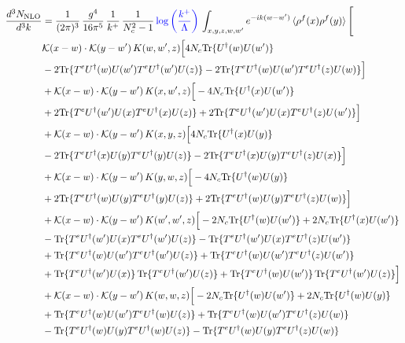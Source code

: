 \documentclass[9pt]{article}
\numberwithin{equation}{section}
\begin{document}
\begin{align}
    \frac{d^{3}N_{\mathrm{NLO}}}{d^{3}k} & = \frac{1}{(2\pi)^{3}}\,\frac{g^{4}}{16\pi^{5}}\,\frac{1}{k^{+}}\,\frac{1}{N^{2}_{c}-1}\,{\color{blue}\log{\left(\frac{k^{+}}{\Lambda}\right)}}\,\int_{x,y,z,w,w'}e^{-ik(w-w')}\,\langle\rho^{f}(x)\rho^{f}(y) \rangle\,\Bigg[\notag \\ & \mathcal K(x-w)\cdot\mathcal K(y-w')\,K(w,w',z)\Big[4 N_{c}{\rm Tr}\{U^\dagger(w)U(w')\}\notag\\
&-2{\rm Tr}\{T^eU^\dagger(w)U(w')T^eU^\dagger(w')U(z)\}-2{\rm Tr}\{T^eU^\dagger(w)U(w')T^eU^\dagger(z)U(w)\}\Big]\notag\\
&+\mathcal K(x-w)\cdot\mathcal K(y-w')\,K(x,w',z)\Big[-4 N_{c}{\rm Tr}\{U^\dagger(x)U(w')\}\notag\\
&+2{\rm Tr}\{T^eU^\dagger(w')U(x)T^eU^\dagger(x)U(z)\}+2{\rm Tr}\{T^eU^\dagger(w')U(x)T^eU^\dagger(z)U(w')\}\Big]\notag\\
&+\mathcal K(x-w)\cdot\mathcal K(y-w')\,K(x,y,z)\Big[4 N_{c}{\rm Tr}\{U^\dagger(x)U(y)\}\notag\\
&-2{\rm Tr}\{T^eU^\dagger(x)U(y)T^eU^\dagger(y)U(z)\}-2{\rm Tr}\{T^eU^\dagger(x)U(y)T^eU^\dagger(z)U(x)\}\Big]\notag\\
&+\mathcal K(x-w)\cdot\mathcal K(y-w')\,K(y,w,z)\Big[-4 N_{c}{\rm Tr}\{U^\dagger(w)U(y)\}\notag\\
&+2{\rm Tr}\{T^eU^\dagger(w)U(y)T^eU^\dagger(y)U(z)\}+2{\rm Tr}\{T^eU^\dagger(w)U(y)T^eU^\dagger(z)U(w)\}\Big]\notag\\
&+\mathcal K(x-w)\cdot\mathcal K(y-w')\,K(w',w',z)\Big[-2 N_{c}{\rm Tr}\{U^\dagger(w)U(w')\}+2 N_{c}{\rm Tr}\{U^\dagger(x)U(w')\}\notag\\
&-{\rm Tr}\{T^eU^\dagger(w')U(x)T^eU^\dagger(w')U(z)\}-{\rm Tr}\{T^eU^\dagger(w')U(x)T^eU^\dagger(z)U(w')\}\notag\\
&+{\rm Tr}\{T^eU^\dagger(w)U(w')T^eU^\dagger(w')U(z)\}+{\rm Tr}\{T^eU^\dagger(w)U(w')T^eU^\dagger(z)U(w')\}\notag\\
&+{\rm Tr}\{T^eU^\dagger(w')U(x)\}\,{\rm Tr}\{T^eU^\dagger(w')U(z)\}+{\rm Tr}\{T^eU^\dagger(w)U(w')\}\,{\rm Tr}\{T^eU^\dagger(w')U(z)\}\Big]\notag\\
&+\mathcal K(x-w)\cdot\mathcal K(y-w')\,K(w,w,z)\Big[-2 N_{c}{\rm Tr}\{U^\dagger(w)U(w')\}+2 N_{c}{\rm Tr}\{U^\dagger(w)U(y)\}\notag\\
&+{\rm Tr}\{T^eU^\dagger(w)U(w')T^eU^\dagger(w)U(z)\}+{\rm Tr}\{T^eU^\dagger(w)U(w')T^eU^\dagger(z)U(w)\}\notag\\
&-{\rm Tr}\{T^eU^\dagger(w)U(y)T^eU^\dagger(w)U(z)\}-{\rm Tr}\{T^eU^\dagger(w)U(y)T^eU^\dagger(z)U(w)\}\notag\\

\end{align}
\end{document}
